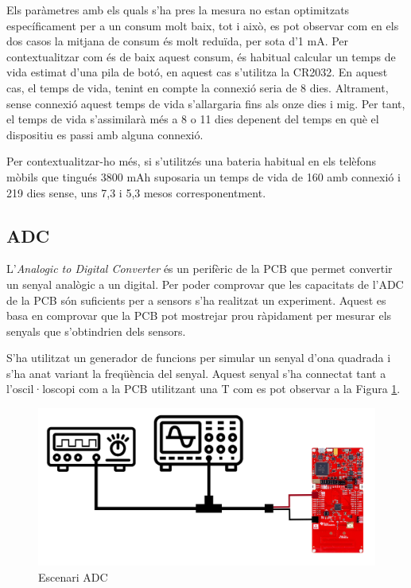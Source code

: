 Els paràmetres amb els quals s'ha pres la mesura no estan optimitzats específicament per a un consum molt baix, tot i això, es pot observar com en els dos casos la mitjana de consum és molt reduïda, per sota d'1 mA.
Per contextualitzar com és de baix aquest consum, és habitual calcular un temps de vida estimat d'una pila de botó, en aquest cas s'utilitza la CR2032.
En aquest cas, el temps de vida, tenint en compte la connexió seria de 8 dies.
Altrament, sense connexió aquest temps de vida s'allargaria fins als onze dies i mig.
Per tant, el temps de vida s'assimilarà més a 8 o 11 dies depenent del temps en què el dispositiu es passi amb alguna connexió.

Per contextualitzar-ho més, si s'utilitzés una bateria habitual en els telèfons mòbils que tingués 3800 mAh suposaria un temps de vida de 160 amb connexió i 219 dies sense, uns 7,3 i 5,3 mesos corresponentment.


\subsection{ADC}
L'\textit{Analogic to Digital Converter} és un perifèric de la PCB que permet convertir un senyal analògic a un digital.
Per poder comprovar que les capacitats de l'ADC de la PCB són suficients per a sensors s'ha realitzat un experiment.
Aquest es basa en comprovar que la PCB pot mostrejar prou ràpidament per mesurar els senyals que s'obtindrien dels sensors.

S'ha utilitzat un generador de funcions per simular un senyal d'ona quadrada i s'ha anat variant la freqüència del senyal. Aquest senyal s'ha connectat tant a l'oscil·loscopi com a la PCB utilitzant una T com es pot observar a la Figura \ref{lab}.

\begin{figure}[!h]
	\begin{center}
		\includegraphics[width=\textwidth]{./images/CicrcuitoExperimentoLab2.png}
		\caption{Escenari ADC}
		\label{lab}
	\end{center}
\end{figure}


